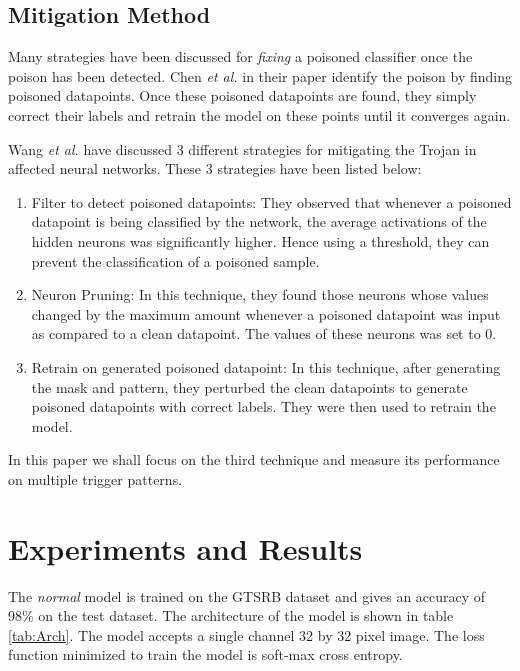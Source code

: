 \documentclass{article}
\newcommand{\etal}[0]{\emph{et al.}}
\begin{document}
\subsection{Mitigation Method}
Many strategies have been discussed for \emph{fixing} a poisoned classifier once the poison has been detected. Chen \etal \cite{chenDetectingBackdoorAttacks2018} in their paper identify the poison by finding poisoned datapoints. Once these poisoned datapoints are found, they simply correct their labels and retrain the model on these points until it converges again.

Wang \etal \cite{wangNeuralCleanseIdentifying} have discussed 3 different strategies for mitigating the Trojan in affected neural networks. These 3 strategies have been listed below:
\begin{enumerate}
    \item Filter to detect poisoned datapoints: They observed that whenever a poisoned datapoint is being classified by the network, the average activations of the hidden neurons was significantly higher. Hence using a threshold, they can prevent the classification of a poisoned sample.
    \item Neuron Pruning: In this technique, they found those neurons whose values changed by the maximum amount whenever a poisoned datapoint was input as compared to a clean datapoint. The values of these neurons was set to 0.
    \item Retrain on generated poisoned datapoint: In this technique, after generating the mask and pattern, they perturbed the clean datapoints to generate poisoned datapoints with correct labels. They were then used to retrain the model.
\end{enumerate}

In this paper we shall focus on the third technique and measure its performance on multiple trigger patterns.
\section{Experiments and Results}
The \emph{normal} model is trained on the GTSRB dataset and gives an accuracy of 98\% on the test dataset. The architecture of the model is shown in table \ref{tab:Arch}. The model accepts a single channel 32 by 32 pixel image. The loss function minimized to train the model is soft-max cross entropy.
\end{document}
